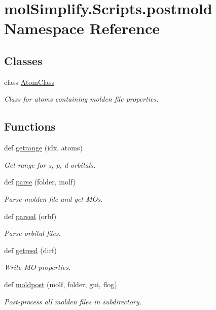 \hypertarget{namespacemolSimplify_1_1Scripts_1_1postmold}{}\section{mol\+Simplify.\+Scripts.\+postmold Namespace Reference}
\label{namespacemolSimplify_1_1Scripts_1_1postmold}
\subsection*{Classes}
\begin{DoxyCompactItemize}
\item 
class \hyperlink{classmolSimplify_1_1Scripts_1_1postmold_1_1AtomClass}{Atom\+Class}
\begin{DoxyCompactList}\small\item\em Class for atoms containing molden file properties. \end{DoxyCompactList}\end{DoxyCompactItemize}
\subsection*{Functions}
\begin{DoxyCompactItemize}
\item 
def \hyperlink{namespacemolSimplify_1_1Scripts_1_1postmold_a261c4fb44005b251970f00bd86df8872}{getrange} (idx, atoms)
\begin{DoxyCompactList}\small\item\em Get range for s, p, d orbitals. \end{DoxyCompactList}\item 
def \hyperlink{namespacemolSimplify_1_1Scripts_1_1postmold_a973ff85c4f2478cb078248e3e2dd4f13}{parse} (folder, molf)
\begin{DoxyCompactList}\small\item\em Parse molden file and get M\+Os. \end{DoxyCompactList}\item 
def \hyperlink{namespacemolSimplify_1_1Scripts_1_1postmold_a496a961797f3d55b5ed1c3b28dd8b64f}{parsed} (orbf)
\begin{DoxyCompactList}\small\item\em Parse orbital files. \end{DoxyCompactList}\item 
def \hyperlink{namespacemolSimplify_1_1Scripts_1_1postmold_ad04b91cd386072cd6630146dc2f7f3c4}{getresd} (dirf)
\begin{DoxyCompactList}\small\item\em Write MO properties. \end{DoxyCompactList}\item 
def \hyperlink{namespacemolSimplify_1_1Scripts_1_1postmold_a3b14df87d5a951bf0f3b7c7ccf2f9f38}{moldpost} (molf, folder, gui, flog)
\begin{DoxyCompactList}\small\item\em Post-\/process all molden files in subdirectory. \end{DoxyCompactList}\end{DoxyCompactItemize}


